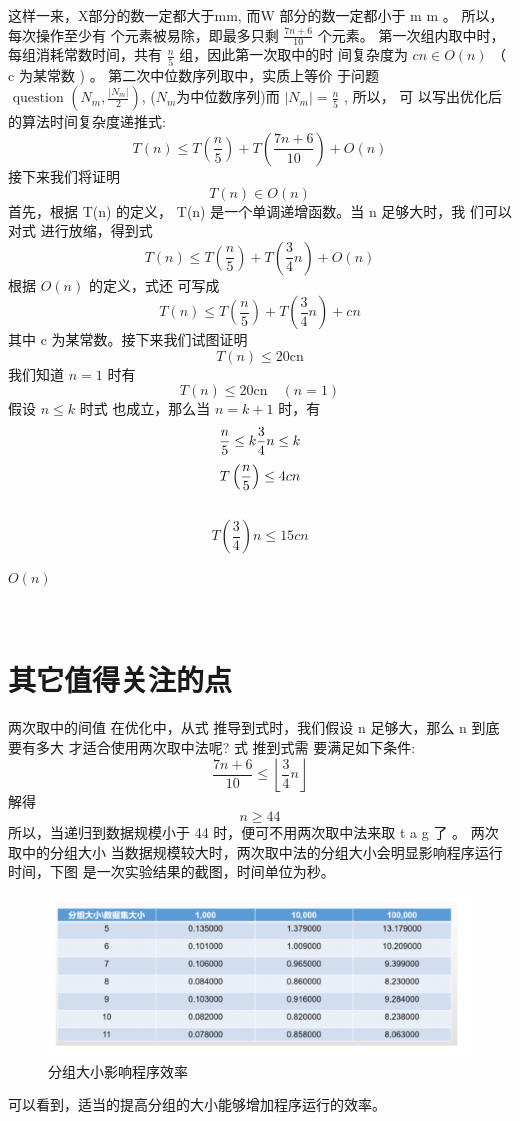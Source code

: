这样一来，X部分的数一定都大于mm, 而W  部分的数一定都小于  m m  。 所以，每次操作至少有    个元素被易除，即最多只剩  $\frac{7 n+6}{10} $ 个元素。
第一次组内取中时，每组消耗常数时间，共有  $ \frac{n}{5} $  组，因此第一次取中的时 间复杂度为  $ c n \in O(n) $ （ c  为某常数  ) 。  第二次中位数序列取中，实质上等价 于问题 
$\text { question }\left(N_{m}, \frac{\left|N_{m}\right|}{2}\right)$,
($N_{m}$为中位数序列)而  $ \left|N_{m}\right|=\frac{n}{5} $ ,  所以， 可 以写出优化后的算法时间复杂度递推式:
$$T(n) \leq T\left(\frac{n}{5}\right)+T\left(\frac{7 n+6}{10}\right)+O(n)$$
接下来我们将证明
$$T(n) \in O(n)$$
首先，根据  T(n)  的定义，  T(n)  是一个单调递增函数。当  n  足够大时，我 们可以对式 进行放缩，得到式
$$T(n) \leq T\left(\frac{n}{5}\right)+T\left(\frac{3}{4} n\right)+O(n)$$
根据 $ O(n) $ 的定义，式还 可写成
$$T(n) \leq T\left(\frac{n}{5}\right)+T\left(\frac{3}{4} n\right)+c n$$
其中  c  为某常数。接下来我们试图证明
$$T(n) \leq 20 \mathrm{cn}$$
我们知道 $ n=1 $ 时有
$$T(n) \leq 20 \mathrm{cn} \quad(n=1)$$
假设 $ n \leq k$  时式 也成立，那么当  $n=k+1$  时，有
$$
\frac{n}{5} \leq k \\
\frac{3}{4} n \leq k
$$
$$
T\left(\frac{n}{5}\right) \leq 4 c n \\
$$
 \\
$$
 T\left(\frac{3}{4}\right) n \leq 15 c n

$$

$ O(n)$

 \\

\section{其它值得关注的点}
两次取中的间值
在优化中，从式 推导到式时，我们假设  n  足够大，那么  n  到底要有多大 才适合使用两次取中法呢?
式 推到式需 要满足如下条件:
$$
\frac{7 n+6}{10} \leq\left\lfloor\frac{3}{4} n\right\rfloor
$$
解得
$$
n \geq 44
$$
所以，当递归到数据规模小于 44 时，便可不用两次取中法来取  t a g 了 。 
两次取中的分组大小
当数据规模较大时，两次取中法的分组大小会明显影响程序运行时间，下图 是一次实验结果的截图，时间单位为秒。
\begin{figure}[htb]
	\centering
	\includegraphics[scale=0.5]{image/kth3.png}
  \caption{分组大小影响程序效率}\label{fig:nearestpoints-divide}
\end{figure}
可以看到，适当的提高分组的大小能够增加程序运行的效率。
